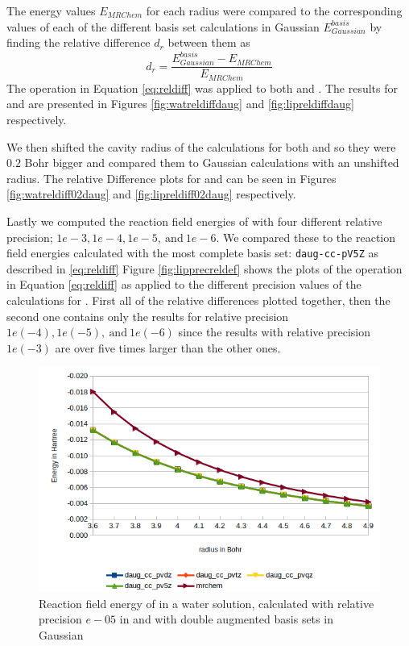 \documentclass[../master_thesis.tex]{subfiles}
\begin{document}
The \mrchem energy values $E_{MRChem}$ for each radius were compared to the
corresponding values of each of the different basis set calculations in
Gaussian  $E_{Gaussian}^{basis}$ by finding the relative difference $d_r$
between them as
\begin{equation}\label{eq:reldiff}
  d_r = \frac{E_{Gaussian}^{basis} - E_{MRChem}}{E_{MRChem}}
\end{equation}
The operation in Equation \ref{eq:reldiff} was applied to both  and .
The results for  and  are presented in Figures \ref{fig:watreldiffdaug}
and \ref{fig:lipreldiffdaug} respectively.

We then shifted the cavity radius of the \mrchem calculations for both  and
 so they were $0.2$ Bohr bigger and compared them to Gaussian calculations
with an unshifted radius. The relative Difference plots for  and  can be seen
in Figures \ref{fig:watreldiff02daug} and \ref{fig:lipreldiff02daug} respectively.

Lastly we computed the reaction field energies of  with four different
relative precision; $1e-3, 1e-4, 1e-5,\  \text{and}\  1e-6$. We compared these
to the reaction field energies calculated with the most complete basis set:
\verb!daug-cc-pV5Z! as described in \ref{eq:reldiff}
Figure \ref{fig:lipprecreldef} shows the plots of the operation in Equation \ref{eq:reldiff}
 as applied to the different precision values of the \mrchem calculations for .
First all of the relative differences plotted together, then the second one contains
only the results for relative precision $1e(-4), 1e(-5),\  \text{and}\  1e(-6)$ since
the results with relative precision $1e(-3)$ are over five times larger than the other ones.

\begin{figure}[!htb]
  \centering
    \includegraphics[width=0.75\linewidth]{img/Erdaugwat.png}
  \caption[Reaction field energy of ]{Reaction field energy of  in a water solution, calculated with relative precision $e-05$ in \mrchem and with double augmented basis sets in Gaussian}
  \label{fig:watEnergyplotsdaug}
\end{figure}
\end{document}
